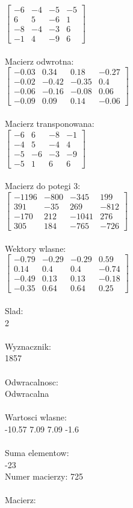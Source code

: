 \documentclass[a4paper,12pt]{article}
\begin{document}
$\begin{bmatrix} -6&-4&-5&-5\\6&5&-6&1\\-8&-4&-3&6\\-1&4&-9&6 \end{bmatrix}$
\\
\\
Macierz odwrotna:\\

$\begin{bmatrix} -0.03&0.34&0.18&-0.27\\-0.02&-0.42&-0.35&0.4\\-0.06&-0.16&-0.08&0.06\\-0.09&0.09&0.14&-0.06 \end{bmatrix}$
\\
\\
Macierz transponowana:\\

$\begin{bmatrix} -6&6&-8&-1\\-4&5&-4&4\\-5&-6&-3&-9\\-5&1&6&6 \end{bmatrix}$
\\
\\
Macierz do potegi 3:\\

$\begin{bmatrix} -1196&-800&-345&199\\391&-35&269&-812\\-170&212&-1041&276\\305&184&-765&-726 \end{bmatrix}$
\\
\\
Wektory wlasne:\\

$\begin{bmatrix} -0.79&-0.29&-0.29&0.59\\0.14&0.4&0.4&-0.74\\-0.49&0.13&0.13&-0.18\\-0.35&0.64&0.64&0.25 \end{bmatrix}$
\\
\\
Slad:\\
2
\\
\\
Wyznacznik:\\
1857
\\
\\
Odwracalnosc:\\
Odwracalna
\\
\\
Wartosci wlasne:\\
-10.57 7.09 7.09 -1.6
\\
\\
Suma elementow:\\
-23
\\
\newpage
Numer macierzy:
725
\\
\\
Macierz:\\
\end{document}
